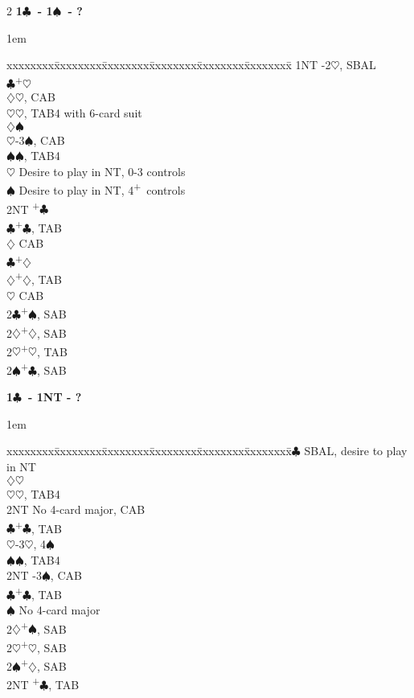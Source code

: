 \documentclass[10pt]{article}
\renewcommand{\c}{$\clubsuit$}
\renewcommand{\d}{$\diamondsuit$}
\newcommand{\h}{$\heartsuit$}
\newcommand{\s}{$\spadesuit$}
\newcommand{\p}{\textsuperscript{+}}
\newenvironment{bidtable}[1][]
{\textbf{#1}
  \begin{adjustwidth}{1em}{}
    \addvspace{2pt}
    \begin{tabbing}
      xxxxxxxx\=xxxxxxxx\=xxxxxxxx\=xxxxxxxx\=xxxxxxxx\=xxxxxxxx\=\kill}
{\end{tabbing}\end{adjustwidth}\bigskip}%
\begin{document}
\begin{multicols*}{2}
\begin{bidtable}[1\c\ - 1\s\ - ?]
1NT -2\h, SBAL                                \\
    \c {}\p\h                               \\
    \>     \d {}\h, CAB                     \\
    \>     \h {}\h, TAB4 with 6-card suit   \\
    \d {}\s                                 \\
    \>     \h {}-3\s, CAB                   \\
    \>     \s {}\s, TAB4                    \\
    \h \> Desire to play in NT, 0-3 controls  \\
    \s \> Desire to play in NT, 4\p\ controls \\
    \> 2NT \p\c                               \\
    \>     \c {}\p\c, TAB                   \\
    \>     \d \> CAB                          \\
    \c {}\p\d                               \\
    \>     \d {}\p\d, TAB                   \\
    \>     \h \> CAB                          \\
2\c {}\p\s, SAB                                 \\
2\d {}\p\d, SAB                                 \\
2\h {}\p\h, TAB                                 \\
2\s {}\p\c, SAB
\end{bidtable}

\begin{bidtable}[1\c\ - 1NT - ?]
2\c \> SBAL, desire to play in NT         \\
    \d {}\h                         \\
    \>     \h {}\h, TAB4            \\
    \>     \> 2NT \> No 4-card major, CAB \\
    \>     \c {}\p\c, TAB           \\
    \h {}-3\h, 4\s                  \\
    \>     \s {}\s, TAB4            \\
    \>     \> 2NT -3\s, CAB           \\
    \>     \c {}\p\c, TAB           \\
    \s \> No 4-card major             \\
2\d {}\p\s, SAB                         \\
2\h {}\p\h, SAB                         \\
2\s {}\p\d, SAB                         \\
2NT \p\c, TAB
\end{bidtable}


\end{multicols*}
\end{document}
